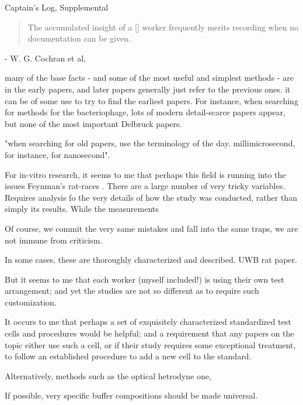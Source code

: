 \documentclass[paper.tex]{subfiles}
\begin{document}
\clearpage
{\Huge Captain's Log, Supplemental}\\

\begin{quote}
The accumulated insight of a [] worker frequently merits recording when no documentation can be given.
\end{quote}

- W. G. Cochran et al, \cite{Statistical1953}



many of the base facts - and some of the most useful and simplest methods - are in the early 
papers, and later papers generally just refer to the previous ones. it can be of some use to try to 
find the earliest papers. For instance, when searching for methods for the bacteriophage, lots of 
modern detail-scarce papers appear, but none of the most important Delbruck papers.

"when searching for old papers, use the terminology of the day. millimicrosecond, for instance, for 
nanosecond".





For in-vitro research, it seems to me that perhaps this field is running into the issues Feynman's rat-races \cite{Cargo}. There are a large number of very tricky variables. Requires analysis fo the very details of how the study was conducted, rather than simply its results. While the measurements 

Of course, we commit the very same mistakes and fall into the same traps, we are not immune from criticism.

In some cases, these are thoroughly characterized and described. UWB rat paper. 

But it seems to me that each worker (myself included!) is using their own test arrangement; and yet the studies are not so different as to require such customization.

It occurs to me that perhaps a set of exquisitely characterized standardized test cells and procedures would be helpful; and a requirement that any papers on the topic either use such a cell, or if their study requires some exceptional treatment, to follow an established procedure to add a new cell to the standard. 

Alternatively, methods such as the optical hetrodyne one,

If possible, very specific buffer compositions should be made universal.
\end{document}
